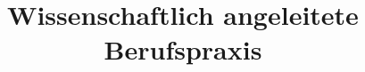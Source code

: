 \usepackage[utf8]{inputenc}
\usepackage[ngerman]{babel}
\usepackage{amsmath}
\usepackage{graphicx}
\usepackage{hyperref}
\usepackage{geometry}
\usepackage[absolute,overlay]{textpos}
\usepackage{setspace}
\usepackage{booktabs}

\geometry{top=3cm, bottom=2cm, left=3cm, right=2cm}

\graphicspath{{assets/images/}}

\title{Wissenschaftlich angeleitete Berufspraxis}
\date{}

\author{\fullname}